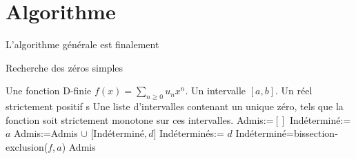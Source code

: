 \documentclass[a4paper,10.5pt]{article}
\begin{document}
	

		
	\section{Algorithme}
	
	L'algorithme générale est finalement
	
	\begin{algorithm}
		\caption{Recherche des zéros simples}
		\begin{algorithmic}[1]
			\REQUIRE Une fonction D-finie $f(x)=\sum_{n \geq 0} u_nx^{n}$. Un intervalle $[a,b]$. Un réel strictement positif s
			\ENSURE  Une liste d'intervalles contenant un unique zéro, tels que la fonction soit strictement monotone sur ces intervalles.
			\STATE Admis:=$[]$
			\STATE Indéterminé:=$a$
				\STATE Admis:=Admis $\cup$ [Indéterminé$,d]$
				\STATE Indéterminés:= $d$  
			\ELSE 
			\STATE Indéterminé=bissection-exclusion($f,a$)
			\ENDIF
			\ENDWHILE
			\RETURN Admis
		\end{algorithmic}
	\end{algorithm}	
	\newpage
	
	
	
	
\end{document}
